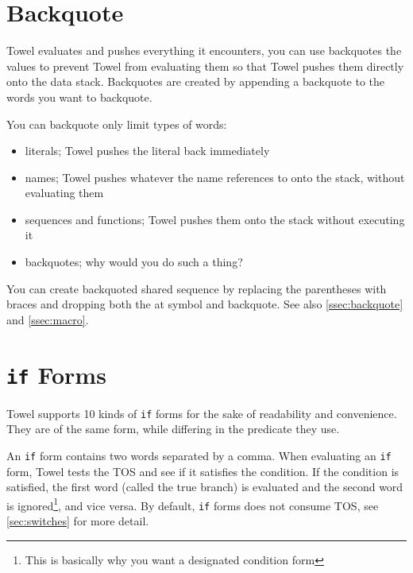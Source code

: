 \documentclass{report}
\begin{document}
\section{Backquote}

Towel evaluates and pushes everything it encounters, you can use backquotes the values to prevent Towel from evaluating them so that Towel pushes them directly onto the data stack. Backquotes are created by appending a backquote to the words you want to backquote.

You can backquote only limit types of words:
\begin{itemize}
\item literals; Towel pushes the literal back immediately
\item names; Towel pushes whatever the name references to onto the stack, without evaluating them
\item sequences and functions; Towel pushes them onto the stack without executing it
\item backquotes; why would you do such a thing?
\end{itemize}

\begin{mdframed}[style=hint]
  You can create backquoted shared sequence by replacing the
  parentheses with braces and dropping both the at symbol and
  backquote. See also \autoref{ssec:backquote} and
  \autoref{ssec:macro}.
\end{mdframed}

\section{\texttt{if} Forms}

Towel supports 10 kinds of \texttt{if} forms for the sake of readability and convenience. They are of the same form, while differing in the predicate they use.

An \texttt{if} form contains two words separated by a comma. When evaluating an \texttt{if} form, Towel tests the TOS and see if it satisfies the condition. If the condition is satisfied, the first word (called the true branch) is evaluated and the second word is ignored\footnote{This is basically why you want a designated condition form}, and vice versa. By default, \texttt{if} forms does not consume TOS, see \autoref{sec:switches} for more detail.
\end{document}
